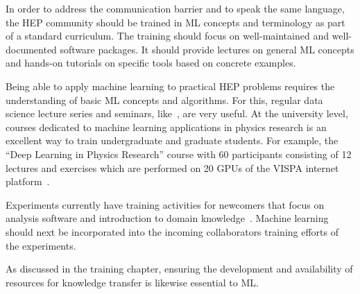
In order to address the communication barrier and to speak the same language, the HEP community should be trained in ML concepts and terminology as part of a standard curriculum. The training should focus on well-maintained and well-documented software packages. It should provide lectures on general ML concepts and hands-on tutorials on specific tools based on concrete examples.

Being able to apply machine learning to practical HEP problems requires the understanding of basic ML concepts and algorithms. For this, regular data science lecture series and seminars, like~\cite{mlhep}, are very useful. At the university level, courses dedicated to machine learning applications in physics research is an excellent way to train undergraduate and graduate students. For example, the ``Deep Learning in Physics Research'' course with 60 participants consisting of 12 lectures and exercises which are performed on 20 GPUs of the VISPA internet platform~\cite{vispa}. %

Experiments currently have training activities for newcomers that focus on analysis software and introduction to domain knowledge~\cite{2016chep.confE.334B}. Machine learning should next be incorporated into the incoming collaborators training efforts of the experiments.

As discussed in the training chapter, ensuring the development and availability of resources for knowledge transfer is likewise essential to ML. %





